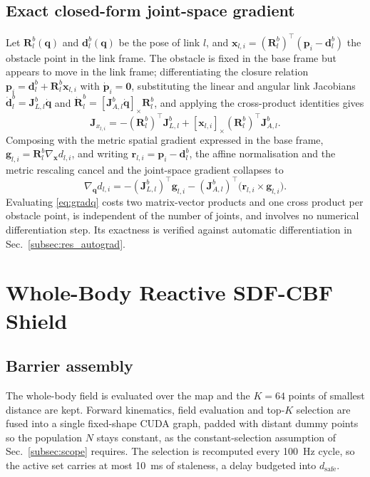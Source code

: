 \documentclass[journal]{IEEEtran}
\newcommand{\qdot}{\dot{\mathbf{q}}}
\newcommand{\dsafe}{d_{\mathrm{safe}}}
\begin{document}
\subsection{Exact closed-form joint-space gradient}\label{subsec:closedform}
Let $\mathbf{R}^b_l(\mathbf{q})$ and $\mathbf{d}^b_l(\mathbf{q})$ be the pose of link $l$, and $\mathbf{x}_{l,i}=(\mathbf{R}^b_l)^{\top}(\mathbf{p}_i-\mathbf{d}^b_l)$ the obstacle point in the link frame. The obstacle is fixed in the base frame but appears to move in the link frame; differentiating the closure relation $\mathbf{p}_i=\mathbf{d}^b_l+\mathbf{R}^b_l\mathbf{x}_{l,i}$ with $\dot{\mathbf{p}}_i=\mathbf{0}$, substituting the linear and angular link Jacobians $\dot{\mathbf{d}}^b_l=\mathbf{J}^b_{L,l}\qdot$ and $\dot{\mathbf{R}}^b_l=[\mathbf{J}^b_{A,l}\qdot]_\times\mathbf{R}^b_l$, and applying the cross-product identities gives
\begin{equation}
\mathbf{J}_{x_{l,i}}=-(\mathbf{R}^b_l)^{\top}\mathbf{J}^b_{L,l}+[\mathbf{x}_{l,i}]_\times(\mathbf{R}^b_l)^{\top}\mathbf{J}^b_{A,l}.
\end{equation}
Composing with the metric spatial gradient expressed in the base frame, $\mathbf{g}_{l,i}=\mathbf{R}^b_l\nabla_{\mathbf{x}}d_{l,i}$, and writing $\mathbf{r}_{l,i}=\mathbf{p}_i-\mathbf{d}^b_l$, the affine normalisation and the metric rescaling cancel and the joint-space gradient collapses to
\begin{equation}\label{eq:gradq}
\boxed{\;\nabla_{\mathbf{q}}d_{l,i}=-(\mathbf{J}^b_{L,l})^{\top}\mathbf{g}_{l,i}-(\mathbf{J}^b_{A,l})^{\top}\big(\mathbf{r}_{l,i}\times\mathbf{g}_{l,i}\big).\;}
\end{equation}
Evaluating \eqref{eq:gradq} costs two matrix-vector products and one cross product per obstacle point, is independent of the number of joints, and involves no numerical differentiation step. Its exactness is verified against automatic differentiation in Sec.~\ref{subsec:res_autograd}.

\section{Whole-Body Reactive SDF-CBF Shield}\label{sec:shield}

\subsection{Barrier assembly}
The whole-body field is evaluated over the map and the $K=64$ points of smallest distance are kept. Forward kinematics, field evaluation and top-$K$ selection are fused into a single fixed-shape CUDA graph, padded with distant dummy points so the population $N$ stays constant, as the constant-selection assumption of Sec.~\ref{subsec:scope} requires. The selection is recomputed every 100~Hz cycle, so the active set carries at most 10~ms of staleness, a delay budgeted into $\dsafe$.
\end{document}
